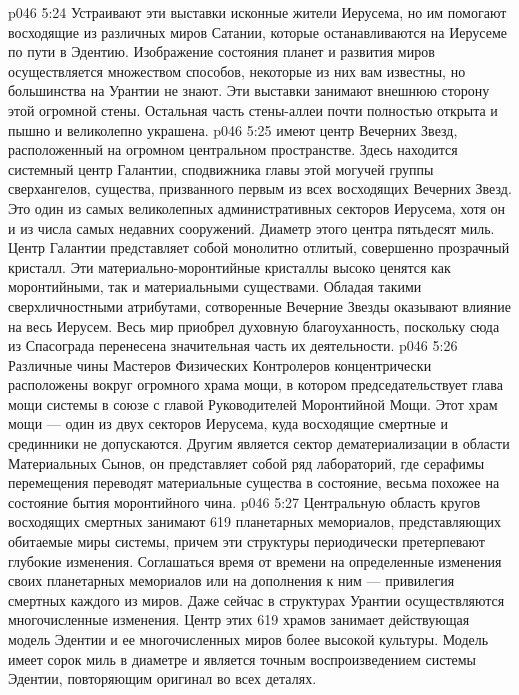 \vs p046 5:24 Устраивают эти выставки исконные жители Иерусема, но им помогают восходящие из различных миров Сатании, которые останавливаются на Иерусеме по пути в Эдентию. Изображение состояния планет и развития миров осуществляется множеством способов, некоторые из них вам известны, но большинства на Урантии не знают. Эти выставки занимают внешнюю сторону этой огромной стены. Остальная часть стены\hyp{}аллеи почти полностью открыта и пышно и великолепно украшена.
\vs p046 5:25 \pc {}\bibnobreakspace {} имеют центр Вечерних Звезд, расположенный на огромном центральном пространстве. Здесь находится системный центр Галантии, сподвижника главы этой могучей группы сверхангелов, существа, призванного первым из всех восходящих Вечерних Звезд. Это один из самых великолепных административных секторов Иерусема, хотя он и из числа самых недавних сооружений. Диаметр этого центра пятьдесят миль. Центр Галантии представляет собой монолитно отлитый, совершенно прозрачный кристалл. Эти материально\hyp{}моронтийные кристаллы высоко ценятся как моронтийными, так и материальными существами. Обладая такими сверхличностными атрибутами, сотворенные Вечерние Звезды оказывают влияние на весь Иерусем. Весь мир приобрел духовную благоуханность, поскольку сюда из Спасограда перенесена значительная часть их деятельности.
\vs p046 5:26 \pc {}\bibnobreakspace {} Различные чины Мастеров Физических Контролеров концентрически расположены вокруг огромного храма мощи, в котором председательствует глава мощи системы в союзе с главой Руководителей Моронтийной Мощи. Этот храм мощи --- один из двух секторов Иерусема, куда восходящие смертные и срединники не допускаются. Другим является сектор дематериализации в области Материальных Сынов, он представляет собой ряд лабораторий, где серафимы перемещения переводят материальные существа в состояние, весьма похожее на состояние бытия моронтийного чина.
\vs p046 5:27 \pc {}\bibnobreakspace {} Центральную область кругов восходящих смертных занимают 619 планетарных мемориалов, представляющих обитаемые миры системы, причем эти структуры периодически претерпевают глубокие изменения. Соглашаться время от времени на определенные изменения своих планетарных мемориалов или на дополнения к ним --- привилегия смертных каждого из миров. Даже сейчас в структурах Урантии осуществляются многочисленные изменения. Центр этих 619 храмов занимает действующая модель Эдентии и ее многочисленных миров более высокой культуры. Модель имеет сорок миль в диаметре и является точным воспроизведением системы Эдентии, повторяющим оригинал во всех деталях.
